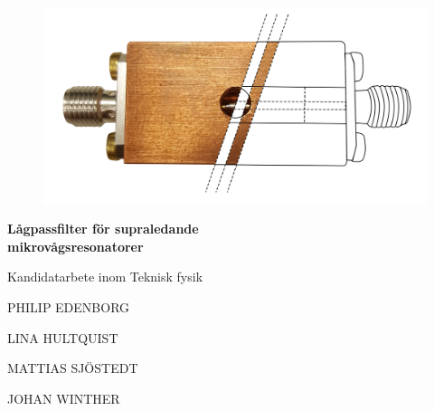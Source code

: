 \documentclass[../../main.tex]{subfiles}
\begin{document}
\begin{titlepage}
			
\addtolength{\voffset}{2cm}

\begin{figure}[H]
\centering
\vspace{3cm}	%
\includegraphics[width=0.8\linewidth]{figure/auxiliary/front.png}
\vspace{2cm}
\end{figure}

\renewcommand{\familydefault}{\sfdefault} \normalfont %
\textbf{{\Huge Lågpassfilter för supraledande \\mikrovågsresonatorer}}

{\Large \undertitel}

Kandidatarbete inom Teknisk fysik
\setlength{\parskip}{0.5cm}

{\Large PHILIP EDENBORG

\setlength{\parskip}{0em}
LINA HULTQUIST

MATTIAS SJÖSTEDT

JOHAN WINTHER

}

\setlength{\parskip}{1cm}

\department\\
\textsc{\university} \\
\adress

\renewcommand{\familydefault}{\rmdefault} \normalfont %
\end{titlepage}


\newpage\null\thispagestyle{empty}\newpage
\restoregeometry
\end{document}
